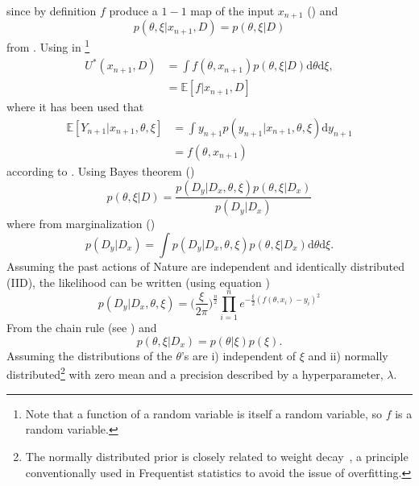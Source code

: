 since by definition $f$ produce a $1-1$ map of the input $x_{n+1}$ () and 
\begin{equation}
	p(\theta,\xi|x_{n+1},D) = p(\theta,\xi|D)
\end{equation} 
from . Using  in \footnote{Note that a function of a random variable is itself a random variable, so $f$ is a random variable.}
\begin{equation}
	\begin{split}
		U^*(x_{n+1},D) & = \int f(\theta,x_{n+1})  p(\theta,\xi|D) \mathrm{d}\theta \mathrm{d}\xi,\\
		& = \mathbb{E}[f|x_{n+1},D]
	\end{split}
	\label{eq:q3}
\end{equation}	
where it has been used that
\begin{equation}
	\begin{split}
		\mathbb{E}[Y_{n+1}|x_{n+1},\theta,\xi] &= \int y_{n+1} p(y_{n+1}|x_{n+1},\theta,\xi) \mathrm{d}y_{n+1} \\
		&= f(\theta,x_{n+1})
	\end{split}
\end{equation}
according to . Using Bayes theorem ()
\begin{equation}
	p(\theta,\xi|D) = \frac{p(D_y|D_x,\theta,\xi)p(\theta,\xi|D_x)}{p(D_y|D_x)}
	\label{eq:bayes2}
\end{equation}
where from marginalization ()
\begin{equation}
	p(D_y|D_x) = \int p(D_y|D_x,\theta,\xi)p(\theta,\xi|D_x) \mathrm{d}\theta \mathrm{d}\xi.
\end{equation}
Assuming the past actions of Nature are independent and identically distributed (IID), the likelihood can be written (using equation )
\begin{equation}
	p(D_y|D_x,\theta,\xi) = \bigg(\frac{\xi}{2\pi}\bigg)^\frac{n}{2}\prod_{i=1}^n e^{-\frac{\xi}{2}(f(\theta,x_i)-y_i)^2}
	\label{reg:likelihood}
\end{equation}
From the chain rule (see ) and 
\begin{equation}
	p(\theta,\xi|D_x) = p(\theta|\xi)p(\xi).
\end{equation}
Assuming the distributions of the $\theta$'s are i) independent of $\xi$ and ii) normally distributed\footnote{The normally distributed prior is closely related to weight decay~\citep{Plaut1986}, a principle conventionally used in Frequentist statistics to avoid the issue of overfitting.} with zero mean and a precision described by a hyperparameter, $\lambda$. 	 
